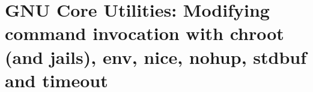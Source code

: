 
\chapter{GNU Core Utilities: Modifying command invocation with chroot (and jails), env, nice, nohup, stdbuf and timeout}
